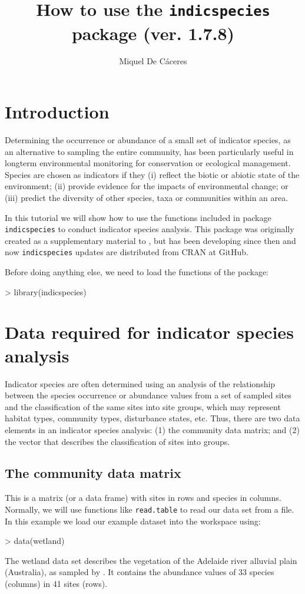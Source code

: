 \documentclass[11pt,a4paper]{article}
\title{How to use the \texttt{indicspecies} package (ver. 1.7.8)}
\author[1]{Miquel De Cáceres}
\affil[1]{CTFC - Forest Sciences and Technology Center of Catalonia, Spain}
\begin{document}

\maketitle
\tableofcontents

\section{Introduction}
Determining the occurrence or abundance of a small set of indicator species, as an alternative to sampling the entire community, has been particularly useful in longterm environmental monitoring for conservation or ecological management. Species are chosen as indicators if they (i) reflect the biotic or abiotic state of the environment; (ii) provide evidence for the impacts of environmental change; or (iii) predict the diversity of other species, taxa or communities within an area. 

In this tutorial we will show how to use the functions included in package \texttt{indicspecies} to conduct indicator species analysis. This package was originally created as a supplementary material to \citet{DeCaceres2009}, but has been developing since then and now \texttt{indicspecies} updates are distributed from CRAN at GitHub. 

Before doing anything else, we need to load the functions of the package:
\begin{Schunk}
\begin{Sinput}
> library(indicspecies)
\end{Sinput}
\end{Schunk}

\section{Data required for indicator species analysis}
Indicator species are often determined using an analysis of the relationship between the species occurrence or abundance values from a set of sampled sites and the classification of the same sites into site groups, which may represent habitat types, community types, disturbance states, etc. Thus, there are two data elements in an indicator species analysis: (1) the community data matrix; and (2) the vector that describes the classification of sites into groups.
\subsection{The community data matrix}
This is a matrix (or a data frame) with sites in rows and species in columns. Normally, we will use functions like \texttt{read.table} to read our data set from a file. In this example we load our example dataset into the workspace using:
\begin{Schunk}
\begin{Sinput}
> data(wetland)
\end{Sinput}
\end{Schunk}
The wetland data set describes the vegetation of the Adelaide river alluvial plain (Australia), as sampled by \citet{Bowman1987}. It contains the abundance values of 33 species (columns) in 41 sites (rows).
\end{document}
